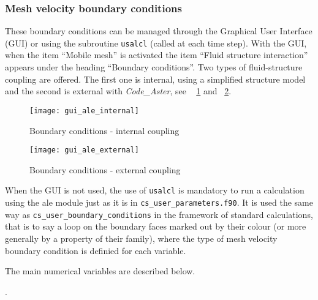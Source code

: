 {{{\subsubsection{Mesh velocity boundary conditions}
These boundary conditions can be managed through the Graphical User Interface (GUI)
 or using the subroutine \texttt{usalcl} (called at each time step). With the GUI,
 when the item ``Mobile mesh'' is activated  the item ``Fluid structure interaction''
 appears under the heading ``Boundary conditions''. Two types of fluid-structure
 coupling are offered. The first one is internal, using a simplified structure
 model and the second is external with \textit{Code\_Aster}, see \figurename~
 \ref{fig:CL-ale1} and \figurename~\ref{fig:CL-ale2}.
%
\begin{figure}[ht]
\begin{center}
\texttt{[image: gui\_ale\_internal]}
\caption{Boundary conditions - internal coupling}
\label{fig:CL-ale1}
\end{center}
\end{figure}
%
\begin{figure}[ht]
\begin{center}
\texttt{[image: gui\_ale\_external]}
\caption{Boundary conditions - external coupling}
\label{fig:CL-ale2}
\end{center}
\end{figure}

When the GUI is not used, the use of \texttt{usalcl} is mandatory to run
a calculation using
the ale module just as it is in \texttt{cs\_user\_parameters.f90}. It is used the same way as
\texttt{cs\_user\_boundary\_conditions} in the framework of
standard calculations, that is to say a loop on the boundary faces
marked out by their colour (or more generally by a property of their
family), where the type of mesh velocity boundary condition is definied for
each variable.

The main numerical variables are described below.

.

}}}
